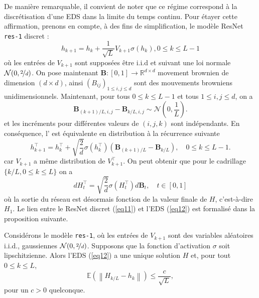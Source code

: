 De manière remarquable, il convient de noter que ce régime correspond à la discrétisation d'une EDS dans la limite du temps continu. Pour étayer cette affirmation, prenons en compte, à des fins de simplification, le modèle ResNet \texttt{res-1} discret :
\begin{equation}\label{eq11}
    h_{k+1} = h_k + \frac{1}{\sqrt{L}}V_{k+1}\sigma(h_k) , 0 \leqslant k \leqslant L-1 
\end{equation}
où les entrées de $V_{k+1}$ sont supposées être i.i.d et suivant une loi normale $\mathcal{N}(0, \nicefrac{2}{d})$.
On pose maintenant $\mathbf{B}:[0,1] \rightarrow \mathbb{R}^{d \times d}$ movement brownien de dimension $ (d \times d) $, ainsi $\left(B_{i j}\right)_{1 \leqslant i, j \leqslant d}$ sont des mouvements browniens unidimensionnels. Maintenant, pour tous $0 \leqslant k \leqslant L-1$ et tous $1 \leqslant i, j \leqslant d$, on a
$$
    \mathbf{B}_{(k+1) / L, i, j}-\mathbf{B}_{k / L, i, j} \sim \mathcal{N}\left(0, \frac{1}{L}\right).
$$
et les incréments pour différentes valeurs de $(i, j, k)$ sont indépendants. En conséquence, l' est équivalente en distribution à la récurrence suivante
$$
    h_{k+1}^{\top}=h_k^{\top}+\sqrt{\frac{2}{d}} \sigma\left(h_k^{\top}\right)\left(\mathbf{B}_{(k+1) / L}-\mathbf{B}_{k / L}\right), \quad 0 \leqslant k \leqslant L-1 .
$$
car $V_{k+1}$ a même distribution de $V_{k+1}^{\top}$. On peut obtenir que pour le cadrillage $\{k / L, 0 \leqslant k \leqslant L\}$ on a
\begin{equation}\label{eq12}
    d H_t^{\top}=\sqrt{\frac{2}{d}} \sigma\left(H_t^{\top}\right) d \mathbf{B}_t, \quad t \in[0,1]
\end{equation}
où la sortie du réseau est désormais fonction de la valeur finale de $H$, c'est-à-dire $H_1$. Le lien entre le ResNet discret (\ref{eq11}) et l'EDS (\ref{eq12}) est formalisé dans la proposition suivante.

\begin{proposition}\label{prop10}
    Considérons le modèle \texttt{res-1}, où les entrées de $V_{k+1}$ sont des variables aléatoires i.i.d., gaussiennes $\mathcal{N}(0, \nicefrac{2}{d})$. Supposons que la fonction d'activation $\sigma$ soit lipschitzienne. Alors l'EDS (\ref{eq12}) a une unique solution $H$ et, pour tout $0 \leqslant k \leqslant L$,
    $$
        \mathbb{E}\left(\left\|H_{k / L}-h_k\right\|\right) \leqslant \frac{c}{\sqrt{L}},
    $$
    pour un $c>0$ quelconque.
\end{proposition}

